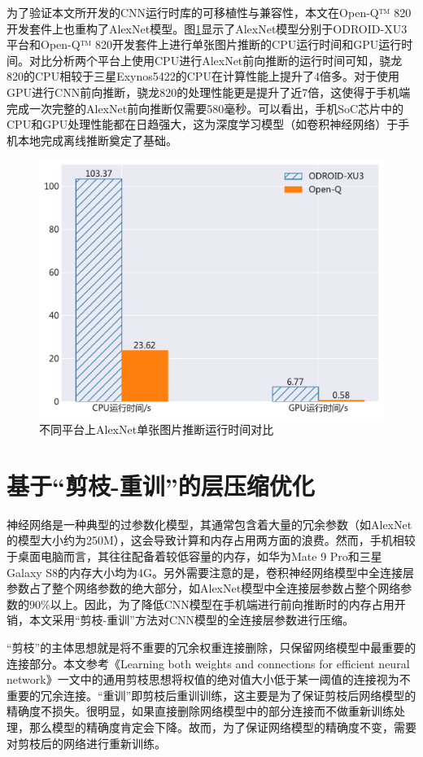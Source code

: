 为了验证本文所开发的CNN运行时库的可移植性与兼容性，本文在Open-Q™ 820开发套件上也重构了AlexNet模型。图\ref{figure:figure19}显示了AlexNet模型分别于ODROID-XU3平台和Open-Q™ 820开发套件上进行单张图片推断的CPU运行时间和GPU运行时间。对比分析两个平台上使用CPU进行AlexNet前向推断的运行时间可知，骁龙820的CPU相较于三星Exynos5422的CPU在计算性能上提升了4倍多。对于使用GPU进行CNN前向推断，骁龙820的处理性能更是提升了近7倍，这使得于手机端完成一次完整的AlexNet前向推断仅需要580毫秒。可以看出，手机SoC芯片中的CPU和GPU处理性能都在日趋强大，这为深度学习模型（如卷积神经网络）于手机本地完成离线推断奠定了基础。

\begin{figure}[htbp]
    \centering
    \includegraphics[height=0.4\textwidth]{figures/open_q.pdf}
    \caption{不同平台上AlexNet单张图片推断运行时间对比}\label{figure:figure19}
\end{figure}

\section{基于“剪枝-重训”的层压缩优化}

神经网络是一种典型的过参数化模型，其通常包含着大量的冗余参数（如AlexNet的模型大小约为250M），这会导致计算和内存占用两方面的浪费。然而，手机相较于桌面电脑而言，其往往配备着较低容量的内存，如华为Mate 9 Pro和三星 Galaxy S8的内存大小均为4G。另外需要注意的是，卷积神经网络模型中全连接层参数占了整个网络参数的绝大部分，如AlexNet模型中全连接层参数占整个网络参数的90\%以上。因此，为了降低CNN模型在手机端进行前向推断时的内存占用开销，本文采用“剪枝-重训”方法对CNN模型的全连接层参数进行压缩。

“剪枝”的主体思想就是将不重要的冗余权重连接删除，只保留网络模型中最重要的连接部分。本文参考《Learning both weights and connections for efficient neural network》\cite{han2015learning}一文中的通用剪枝思想将权值的绝对值大小低于某一阈值的连接视为不重要的冗余连接。“重训”即剪枝后重训训练，这主要是为了保证剪枝后网络模型的精确度不损失。很明显，如果直接删除网络模型中的部分连接而不做重新训练处理，那么模型的精确度肯定会下降。故而，为了保证网络模型的精确度不变，需要对剪枝后的网络进行重新训练。

